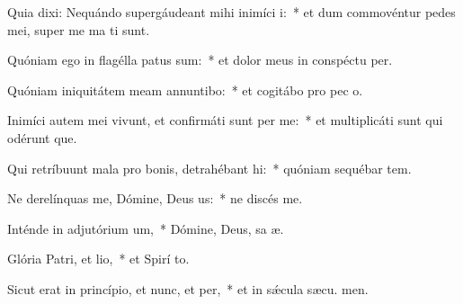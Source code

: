 \item Quia dixi: Nequándo supergáudeant mihi inimíci i:~* et dum commovéntur pedes mei, super me ma ti sunt.
\item Quóniam ego in flagélla patus sum:~* et dolor meus in conspéctu  per.
\item Quóniam iniquitátem meam annuntibo:~* et cogitábo pro pec o.
\item Inimíci autem mei vivunt, et confirmáti sunt per me:~* et multiplicáti sunt qui odérunt  que.
\item Qui retríbuunt mala pro bonis, detrahébant hi:~* quóniam sequébar tem.
\item Ne derelínquas me, Dómine, Deus us:~* ne discés  me.
\item Inténde in adjutórium um,~* Dómine, Deus, sa æ.
\item Glória Patri, et lio,~* et Spirí to.
\item Sicut erat in princípio, et nunc, et per,~* et in sǽcula sæcu. men.
